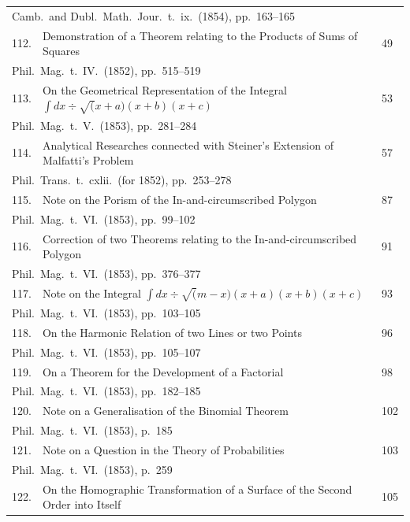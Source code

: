 \documentclass[11pt,a4paper]{article}
\theoremstyle{plain}
\begin{document}
\begin{longtable}{rp{8cm}l}
\multicolumn{3}{l}{\small Camb.\ and Dubl.\ Math.\ Jour.\ t.\ ix.\ (1854), pp.\ 163--165}\\[0.5em]
112. & Demonstration of a Theorem relating to the Products of Sums of Squares & 49\\
\multicolumn{3}{l}{\small Phil.\ Mag.\ t.\ IV.\ (1852), pp.\ 515--519}\\[0.5em]
113. & On the Geometrical Representation of the Integral $\int dx \div \surd(x+a)(x+b)(x+c)$ & 53\\
\multicolumn{3}{l}{\small Phil.\ Mag.\ t.\ V.\ (1853), pp.\ 281--284}\\[0.5em]
114. & Analytical Researches connected with Steiner's Extension of Malfatti's Problem & 57\\
\multicolumn{3}{l}{\small Phil.\ Trans.\ t.\ cxlii.\ (for 1852), pp.\ 253--278}\\[0.5em]
115. & Note on the Porism of the In-and-circumscribed Polygon & 87\\
\multicolumn{3}{l}{\small Phil.\ Mag.\ t.\ VI.\ (1853), pp.\ 99--102}\\[0.5em]
116. & Correction of two Theorems relating to the In-and-circumscribed Polygon & 91\\
\multicolumn{3}{l}{\small Phil.\ Mag.\ t.\ VI.\ (1853), pp.\ 376--377}\\[0.5em]
117. & Note on the Integral $\int dx \div \surd(m-x)(x+a)(x+b)(x+c)$ & 93\\
\multicolumn{3}{l}{\small Phil.\ Mag.\ t.\ VI.\ (1853), pp.\ 103--105}\\[0.5em]
118. & On the Harmonic Relation of two Lines or two Points & 96\\
\multicolumn{3}{l}{\small Phil.\ Mag.\ t.\ VI.\ (1853), pp.\ 105--107}\\[0.5em]
119. & On a Theorem for the Development of a Factorial & 98\\
\multicolumn{3}{l}{\small Phil.\ Mag.\ t.\ VI.\ (1853), pp.\ 182--185}\\[0.5em]
120. & Note on a Generalisation of the Binomial Theorem & 102\\
\multicolumn{3}{l}{\small Phil.\ Mag.\ t.\ VI.\ (1853), p.\ 185}\\[0.5em]
121. & Note on a Question in the Theory of Probabilities & 103\\
\multicolumn{3}{l}{\small Phil.\ Mag.\ t.\ VI.\ (1853), p.\ 259}\\[0.5em]
122. & On the Homographic Transformation of a Surface of the Second Order into Itself & 105\\

\end{longtable}
\end{document}
